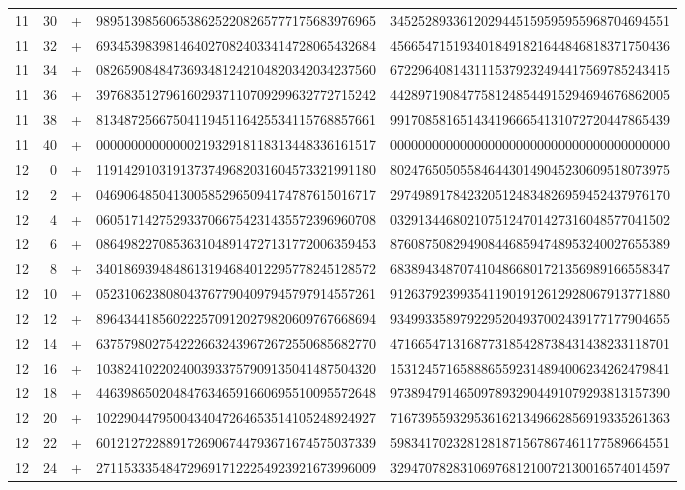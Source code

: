 \begin{longtable}{rrrll}
11 & 30 & + & 9895139856065386252208265777175683976965 & 3452528933612029445159595955968704694551 \\
11 & 32 & + & 6934539839814640270824033414728065432684 & 4566547151934018491821644846818371750436 \\
11 & 34 & + & 0826590848473693481242104820342034237560 & 6722964081431115379232494417569785243415 \\
11 & 36 & + & 3976835127961602937110709299632772715242 & 4428971908477581248544915294694676862005 \\
11 & 38 & + & 8134872566750411945116425534115768857661 & 9917085816514341966654131072720447865439 \\
11 & 40 & + & 0000000000000021932918118313448336161517 & 0000000000000000000000000000000000000000 \\
12 & 0 & + & 1191429103191373749682031604573321991180 & 8024765050558464430149045230609518073975 \\
12 & 2 & + & 0469064850413005852965094174787615016717 & 2974989178423205124834826959452437976170 \\
12 & 4 & + & 0605171427529337066754231435572396960708 & 0329134468021075124701427316048577041502 \\
12 & 6 & + & 0864982270853631048914727131772006359453 & 8760875082949084468594748953240027655389 \\
12 & 8 & + & 3401869394848613194684012295778245128572 & 6838943487074104866801721356989166558347 \\
12 & 10 & + & 0523106238080437677904097945797914557261 & 9126379239935411901912612928067913771880 \\
12 & 12 & + & 8964344185602225709120279820609767668694 & 9349933589792295204937002439177177904655 \\
12 & 14 & + & 6375798027542226632439672672550685682770 & 4716654713168773185428738431438233118701 \\
12 & 16 & + & 1038241022024003933757909135041487504320 & 1531245716588865592314894006234262479841 \\
12 & 18 & + & 4463986502048476346591660695510095572648 & 9738947914650978932904491079293813157390 \\
12 & 20 & + & 1022904479500434047264653514105248924927 & 7167395593295361621349662856919335261363 \\
12 & 22 & + & 6012127228891726906744793671674575037339 & 5983417023281281871567867461177589664551 \\
12 & 24 & + & 2711533354847296917122254923921673996009 & 3294707828310697681210072130016574014597 \\

\end{longtable}
